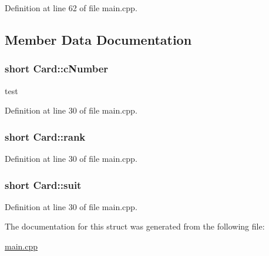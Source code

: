 Definition at line 62 of file main.\+cpp.



\subsection{Member Data Documentation}
\subsubsection[{\texorpdfstring{c\+Number}{cNumber}}]{\setlength{\rightskip}{0pt plus 5cm}short Card\+::c\+Number}\hypertarget{struct_card_a564ce6f9b22bb66a4055fbf2a7a79347}{}\label{struct_card_a564ce6f9b22bb66a4055fbf2a7a79347}
test 

Definition at line 30 of file main.\+cpp.

\subsubsection[{\texorpdfstring{rank}{rank}}]{\setlength{\rightskip}{0pt plus 5cm}short Card\+::rank}\hypertarget{struct_card_a8045fdfbf3c5a7e77276266df90cf9e0}{}\label{struct_card_a8045fdfbf3c5a7e77276266df90cf9e0}


Definition at line 30 of file main.\+cpp.

\subsubsection[{\texorpdfstring{suit}{suit}}]{\setlength{\rightskip}{0pt plus 5cm}short Card\+::suit}\hypertarget{struct_card_adbbdc45f711b78c1e08aecfb6e079d3d}{}\label{struct_card_adbbdc45f711b78c1e08aecfb6e079d3d}


Definition at line 30 of file main.\+cpp.



The documentation for this struct was generated from the following file\+:\begin{DoxyCompactItemize}
\item 
\hyperlink{main_8cpp}{main.\+cpp}\end{DoxyCompactItemize}
